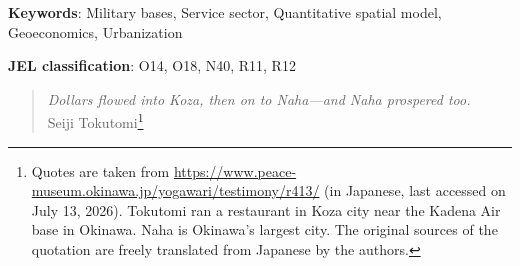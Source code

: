 \documentclass[12pt, unicode, a4paper]{article}
\newcommand{\1}{\mbox{1}\hspace{-0.25em}\mbox{l}} %
\begin{document}
\maketitle
\begin{abstract}
We examine how external expenditure and employment shape urbanization and economic structure. Using newly digitized data from Okinawa, Japan, we document urbanization without industrialization around US military bases, with service-sector expansion but little manufacturing growth. We calibrate a quantitative spatial model to 1970. In a counterfactual that removes base-sourced expenditure, land-rent income, and employment, base-exposed municipalities lose residents and shift from services toward agriculture and manufacturing. Okinawa-wide welfare falls by 7.25\% and GNI by 11.99\%, although base-related consumption demand and employment accounted for roughly 30\% of GNI. Sectoral reallocation mitigates these losses alongside sizable migration. The model-implied effects of consumption demand and employment match the observed pattern qualitatively but fall short quantitatively. Evidence on infrastructure and early commercial access suggests that past investment in infrastructure and durable capital may help explain this gap.\end{abstract}

\noindent \textbf{Keywords}: Military bases, Service sector, Quantitative spatial model, Geoeconomics, Urbanization 

\noindent \textbf{JEL classification}: O14, O18, N40, R11, R12

\newpage



\begin{quote}
\begin{flushright}
\textit{Dollars flowed into Koza, then on to Naha—and Naha prospered too.} \\
Seiji Tokutomi\footnote{
Quotes are taken from \url{https://www.peace-museum.okinawa.jp/yogawari/testimony/r413/} (in Japanese, last accessed on July 13, 2026). 
Tokutomi ran a restaurant in Koza city near the Kadena Air base in Okinawa. Naha is Okinawa's largest city. The original sources of the quotation are freely translated from Japanese by the authors.
}
\end{flushright}
\end{quote}
\end{document}
